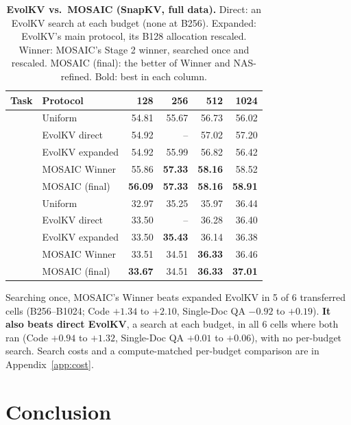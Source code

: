 \documentclass[11pt]{article}
\begin{document}
\begin{table}[t]
  \centering
  \scriptsize
  \setlength{\tabcolsep}{2.8pt}
  \renewcommand{\arraystretch}{0.85}
  \begin{tabular}{@{} c l rrrr @{}}
    \toprule
    \textbf{Task} & \textbf{Protocol} & \textbf{128} & \textbf{256} & \textbf{512} & \textbf{1024} \\
    \midrule
     & Uniform & 54.81 & 55.67 & 56.73 & 56.02 \\
     & EvolKV direct & 54.92 & -- & 57.02 & 57.20 \\
     & EvolKV expanded & 54.92 & 55.99 & 56.82 & 56.42 \\
     & MOSAIC Winner & 55.86 & \textbf{57.33} & \textbf{58.16} & 58.52 \\
     & MOSAIC (final) & \textbf{56.09} & \textbf{57.33} & \textbf{58.16} & \textbf{58.91} \\
    \midrule
     & Uniform & 32.97 & 35.25 & 35.97 & 36.44 \\
     & EvolKV direct & 33.50 & -- & 36.28 & 36.40 \\
     & EvolKV expanded & 33.50 & \textbf{35.43} & 36.14 & 36.38 \\
     & MOSAIC Winner & 33.51 & 34.51 & \textbf{36.33} & 36.46 \\
     & MOSAIC (final) & \textbf{33.67} & 34.51 & \textbf{36.33} & \textbf{37.01} \\
    \bottomrule
  \end{tabular}
  \caption{\textbf{EvolKV vs.\ MOSAIC (SnapKV, full data).} Direct: an EvolKV search at each budget (none at B256). Expanded: EvolKV's main protocol, its B128 allocation rescaled. Winner: MOSAIC's Stage 2 winner, searched once and rescaled. MOSAIC (final): the better of Winner and NAS-refined. Bold: best in each column.}
  \label{tab:ablation}
\end{table}

Searching once, MOSAIC's Winner beats expanded EvolKV in 5 of 6 transferred cells (B256--B1024; Code $+1.34$ to $+2.10$, Single-Doc QA $-0.92$ to $+0.19$). \textbf{It also beats direct EvolKV}, a search at each budget, in all 6 cells where both ran (Code $+0.94$ to $+1.32$, Single-Doc QA $+0.01$ to $+0.06$), with no per-budget search. Search costs and a compute-matched per-budget comparison are in Appendix~\ref{app:cost}. 

\FloatBarrier
\section{Conclusion}
\end{document}

